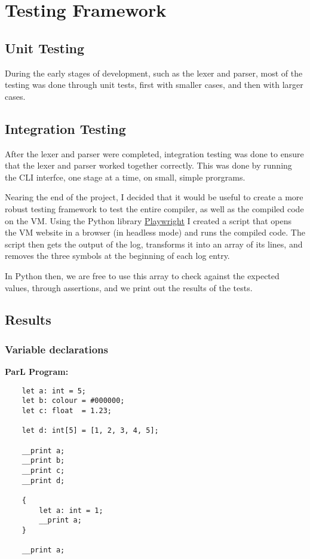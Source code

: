 \section{Testing Framework}

\subsection{Unit Testing}

During the early stages of development, such as the lexer and parser, most of
the testing was done through unit tests, first with smaller cases, and then with
larger cases.

\subsection{Integration Testing}

After the lexer and parser were completed, integration testing was done to
ensure that the lexer and parser worked together correctly. This was done by
running the CLI interfce, one stage at a time, on small, simple prorgrams.

Nearing the end of the project, I decided that it would be useful to create a
more robust testing framework to test the entire compiler, as well as the
compiled code on the VM. Using the Python library
\href{https://playwright.dev/python/}{Playwright} I created a script that opens
the VM website in a browser (in headless mode) and runs the compiled code. The
script then gets the output of the log, transforms it into an array of its
lines, and removes the three  symbols at the beginning of each log
entry.

In Python then, we are free to use this array to check against the expected
values, through assertions, and we print out the results of the tests.



\subsection{Results}

\subsubsection*{Variable declarations}

\textbf{ParL Program:}

\begin{lstlisting}
    let a: int = 5;
    let b: colour = #000000;
    let c: float  = 1.23;

    let d: int[5] = [1, 2, 3, 4, 5];

    __print a;
    __print b;
    __print c;
    __print d;

    {
        let a: int = 1;
        __print a;
    }

    __print a;
\end{lstlisting}

